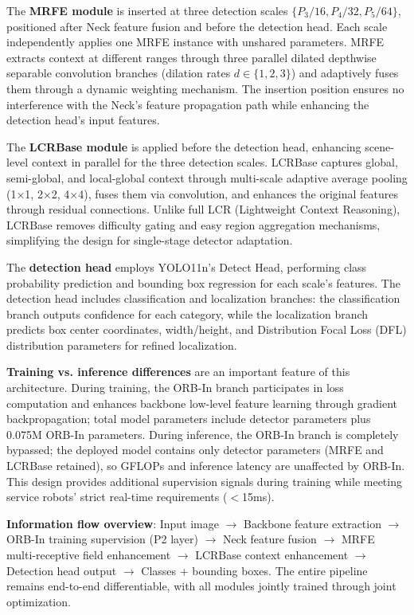 \documentclass[journal]{IEEEtran}
\begin{document}
The \textbf{MRFE module} is inserted at three detection scales $\{P_3/16, P_4/32, P_5/64\}$, positioned after Neck feature fusion and before the detection head. Each scale independently applies one MRFE instance with unshared parameters. MRFE extracts context at different ranges through three parallel dilated depthwise separable convolution branches (dilation rates $d\in\{1,2,3\}$) and adaptively fuses them through a dynamic weighting mechanism. The insertion position ensures no interference with the Neck's feature propagation path while enhancing the detection head's input features.

The \textbf{LCRBase module} is applied before the detection head, enhancing scene-level context in parallel for the three detection scales. LCRBase captures global, semi-global, and local-global context through multi-scale adaptive average pooling (1×1, 2×2, 4×4), fuses them via convolution, and enhances the original features through residual connections. Unlike full LCR (Lightweight Context Reasoning), LCRBase removes difficulty gating and easy region aggregation mechanisms, simplifying the design for single-stage detector adaptation.

The \textbf{detection head} employs YOLO11n's Detect Head, performing class probability prediction and bounding box regression for each scale's features. The detection head includes classification and localization branches: the classification branch outputs confidence for each category, while the localization branch predicts box center coordinates, width/height, and Distribution Focal Loss (DFL) distribution parameters for refined localization.

\textbf{Training vs. inference differences} are an important feature of this architecture. During training, the ORB-In branch participates in loss computation and enhances backbone low-level feature learning through gradient backpropagation; total model parameters include detector parameters plus 0.075M ORB-In parameters. During inference, the ORB-In branch is completely bypassed; the deployed model contains only detector parameters (MRFE and LCRBase retained), so GFLOPs and inference latency are unaffected by ORB-In. This design provides additional supervision signals during training while meeting service robots' strict real-time requirements ($<$15ms).

\textbf{Information flow overview}: Input image $\rightarrow$ Backbone feature extraction $\rightarrow$ ORB-In training supervision (P2 layer) $\rightarrow$ Neck feature fusion $\rightarrow$ MRFE multi-receptive field enhancement $\rightarrow$ LCRBase context enhancement $\rightarrow$ Detection head output $\rightarrow$ Classes + bounding boxes. The entire pipeline remains end-to-end differentiable, with all modules jointly trained through joint optimization.
\end{document}
